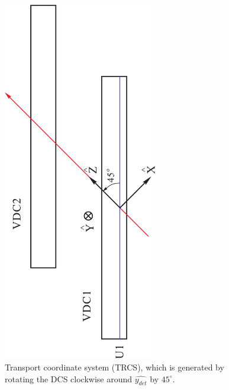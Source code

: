 \begin{itemize}
    \begin{figure}[!ht]
    \begin{center}
      \includegraphics[type=pdf,ext=.pdf,read=.pdf,angle=270,width=0.60\textwidth]{./figures/optics/TRCS_new}
      \caption[Transport coordinate system (TRCS)]{\footnotesize{Transport coordinate system (TRCS), which is generated by rotating the DCS clockwise around  $\hat{y_{det}}$ by $45^{\circ}$.}}
      \label{TRCS}
    \end{center}
  \end{figure}
    \begin{figure}[!ht]
    \begin{center}

\end{center}
\end{figure}
\end{itemize}
